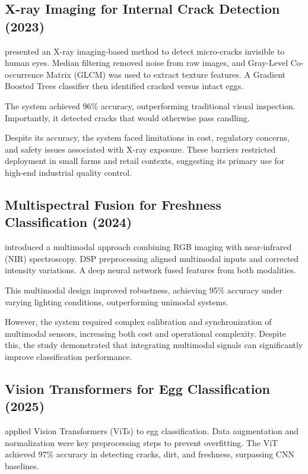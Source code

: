 \documentclass[conference]{IEEEtran}
\begin{document}
	\subsection{X-ray Imaging for Internal Crack Detection (2023)}
	\cite{kumar2023xray} presented an X-ray imaging-based method to detect micro-cracks invisible to human eyes. Median filtering removed noise from raw images, and Gray-Level Co-occurrence Matrix (GLCM) was used to extract texture features. A Gradient Boosted Trees classifier then identified cracked versus intact eggs.  
	
	The system achieved 96\% accuracy, outperforming traditional visual inspection. Importantly, it detected cracks that would otherwise pass candling.  
	
	Despite its accuracy, the system faced limitations in cost, regulatory concerns, and safety issues associated with X-ray exposure. These barriers restricted deployment in small farms and retail contexts, suggesting its primary use for high-end industrial quality control.
	
	\subsection{Multispectral Fusion for Freshness Classification (2024)}
	\cite{garcia2024fusion} introduced a multimodal approach combining RGB imaging with near-infrared (NIR) spectroscopy. DSP preprocessing aligned multimodal inputs and corrected intensity variations. A deep neural network fused features from both modalities.  
	
	This multimodal design improved robustness, achieving 95\% accuracy under varying lighting conditions, outperforming unimodal systems.  
	
	However, the system required complex calibration and synchronization of multimodal sensors, increasing both cost and operational complexity. Despite this, the study demonstrated that integrating multimodal signals can significantly improve classification performance.
	
	\subsection{Vision Transformers for Egg Classification (2025)}
	\cite{huang2025vit} applied Vision Transformers (ViTs) to egg classification. Data augmentation and normalization were key preprocessing steps to prevent overfitting. The ViT achieved 97\% accuracy in detecting cracks, dirt, and freshness, surpassing CNN baselines.  
	
\end{document}
